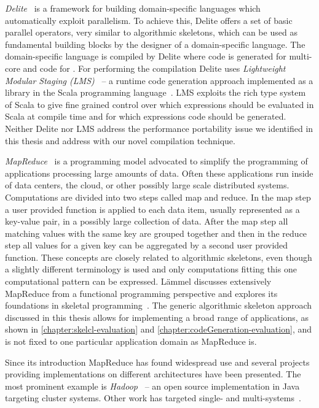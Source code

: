 \emph{Delite}~\cite{ChafiSBLAO11,LeeBSCROO11,BrownSLRCOO11} is a framework for building domain-specific languages which automatically exploit parallelism.
To achieve this, Delite offers a set of basic parallel operators, very similar to algorithmic skeletons, which can be used as fundamental building blocks by the designer of a domain-specific language.
The domain-specific language is compiled by Delite where \Cpp code is generated for multi-core \CPUs and \CUDA code for \GPUs.
For performing the compilation Delite uses \emph{Lightweight Modular Staging  ({\small LMS})}~\cite{RompfO12} -- a runtime code generation approach implemented as a library in the Scala programming language~\cite{Odersky06,OderskyR14}.
{\small LMS} exploits the rich type system of Scala to give fine grained control over which expressions should be evaluated in Scala at compile time and for which expressions code should be generated.
Neither Delite nor {\small LMS} address the performance portability issue we identified in this thesis and address with our novel compilation technique.

\bigskip

\emph{MapReduce}~\cite{DeanG04} is a programming model advocated to simplify the programming of applications processing large amounts of data.
Often these applications run inside of data centers, the cloud, or other possibly large scale distributed systems.
Computations are divided into two steps called map and reduce.
In the map step a user provided function is applied to each data item, usually represented as a key-value pair, in a possibly large collection of data.
After the map step all matching values with the same key are grouped together and then in the reduce step all values for a given key can be aggregated by a second user provided function.
These concepts are closely related to algorithmic skeletons, even though a slightly different terminology is used and only computations fitting this one computational pattern can be expressed.
L{\"a}mmel discusses extensively MapReduce from a functional programming perspective and explores its foundations in skeletal programming~\cite{Laemmel2007}.
The generic algorithmic skeleton approach discussed in this thesis allows for implementing a broad range of applications, as shown in \autoref{chapter:skelcl-evaluation} and \autoref{chapter:codeGeneration-evaluation}, and is not fixed to one particular application domain as MapReduce is.

Since its introduction MapReduce has found widespread use and several projects providing implementations on different architectures have been presented.
The most prominent example is \emph{Hadoop}~\cite{Hadoop} -- an open source implementation in Java targeting cluster systems.
Other work has targeted single- and multi-\GPU systems~\cite{StuartO11,FangHLG11}.

